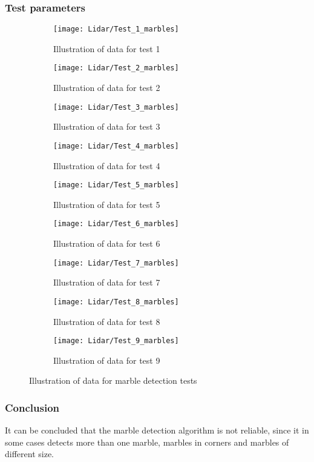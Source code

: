 \documentclass[../Head/Main.tex]{subfiles}
\begin{document}
\subsubsection{Test parameters}
\begin{figure}[H]
  \begin{subfigure}[b]{0.3\textwidth}
  	\centering
    \texttt{[image: Lidar/Test\_1\_marbles]}
    \caption{Illustration of data for test 1}
    \label{fig:Marbletest1}
  \end{subfigure}
  \hfill
  \begin{subfigure}[b]{0.3\textwidth}
  	\centering
    \texttt{[image: Lidar/Test\_2\_marbles]}
    \caption{Illustration of data for test 2}
    \label{fig:Marblestest2}
  \end{subfigure}
  \hfill
  \begin{subfigure}[b]{0.3\textwidth}
    \centering
    \texttt{[image: Lidar/Test\_3\_marbles]}
    \caption{Illustration of data for test 3}
    \label{fig:Marblestest3}
  \end{subfigure}
  \hfill
  \begin{subfigure}[b]{0.3\textwidth}
    \centering
    \texttt{[image: Lidar/Test\_4\_marbles]}
    \caption{Illustration of data for test 4}
    \label{fig:Marblestest4}
  \end{subfigure}
  \hfill
  \begin{subfigure}[b]{0.3\textwidth}
    \centering
    \texttt{[image: Lidar/Test\_5\_marbles]}
    \caption{Illustration of data for test 5}
    \label{fig:Marblestest5}
  \end{subfigure}
  \hfill
  \begin{subfigure}[b]{0.3\textwidth}
    \centering
    \texttt{[image: Lidar/Test\_6\_marbles]}
    \caption{Illustration of data for test 6}
    \label{fig:Marblestest6}
  \end{subfigure}
  \hfill
  \begin{subfigure}[b]{0.3\textwidth}
    \centering
    \texttt{[image: Lidar/Test\_7\_marbles]}
    \caption{Illustration of data for test 7}
    \label{fig:Marblestest7}
  \end{subfigure}
  \hfill
  \begin{subfigure}[b]{0.3\textwidth}
    \centering
    \texttt{[image: Lidar/Test\_8\_marbles]}
    \caption{Illustration of data for test 8}
    \label{fig:Marblestest8}
  \end{subfigure}
  \hfill
  \begin{subfigure}[b]{0.3\textwidth}
    \centering
    \texttt{[image: Lidar/Test\_9\_marbles]}
    \caption{Illustration of data for test 9}
    \label{fig:Marblestest9}
  \end{subfigure}
  \caption{Illustration of data for marble detection tests}
  \label{fig:Marblestests}
\end{figure}

\subsubsection{Conclusion}
It can be concluded that the marble detection algorithm is not reliable, since it in some cases detects more than one marble, marbles in corners and marbles of different size.
\end{document}
